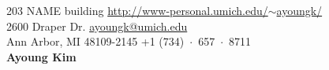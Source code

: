 \documentclass{resume} %
\begin{document}
203 NAME building \hfill \href{http://www-personal.umich.edu/$\sim$ayoungk/}{http://www-personal.umich.edu/$\sim$ayoungk/}\\
2600 Draper Dr. \hfill \href{mailto:ayoungk@umich.edu}{ayoungk@umich.edu}\\
Ann Arbor, MI 48109-2145 \hfill +1 (734)~$\cdot$~657~$\cdot$~8711\\

\hfil{\namesize\bf Ayoung Kim}\hfil








\end{document}
